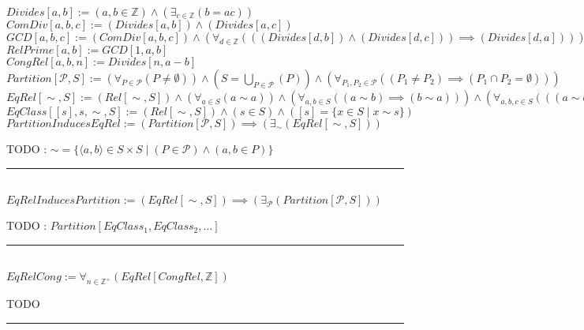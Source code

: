 \documentclass{book}
\newcommand{\abr}{:=}
\newcommand{\st}{\mathbin{|}}
\begin{document}
$Divides[a, b] \abr (a, b \in \mathbb{Z}) \land (\exists_{c \in \mathbb{Z}}(b = a c))$ \\
$ComDiv[a, b, c] \abr (Divides[a, b]) \land (Divides[a, c])$ \\
$GCD[a, b, c] \abr (ComDiv[a, b, c]) \land (\forall_{d \in \mathbb{Z}}(((Divides[d, b]) \land (Divides[d, c])) \implies (Divides[d, a])))$ \\
$RelPrime[a, b] \abr GCD[1, a, b]$ \\
$CongRel[a, b, n] \abr Divides[n, a - b]$ \\

$Partition[\mathcal{P}, S] \abr (\forall_{P \in \mathcal{P}}(P \neq \emptyset)) \land (S = \bigcup\limits_{P \in \mathcal{P}}(P)) \land (\forall_{P_1, P_2 \in \mathcal{P}}((P_1 \neq P_2) \implies (P_1 \cap P_2 = \emptyset)))$ \\
$EqRel[\sim, S] \abr (Rel[\sim, S]) \land (\forall_{a \in S}(a \sim a)) \land (\forall_{a, b \in S}((a \sim b) \implies (b \sim a))) \land (\forall_{a, b, c \in S}(((a \sim b) \land (b \sim c)) \implies (a \sim c)))$ \\
$EqClass[[s], s, \sim, S] \abr (Rel[\sim, S]) \land (s \in S) \land ([s] = \{x \in S \st x \sim s\})$ \\

$PartitionInducesEqRel \abr (Partition[\mathcal{P}, S]) \implies (\exists_{\sim}(EqRel[\sim, S]))$
\begin{enumerate}
  \lit TODO : $\sim = \{\langle a, b \rangle \in S \times S \st (P \in \mathcal{P}) \land (a, b \in P)\}$
\end{enumerate} \vspace{.75mm} \hrule \vspace{.75mm} \ \\ 

$EqRelInducesPartition \abr (EqRel[\sim, S]) \implies (\exists_{\mathcal{P}}(Partition[\mathcal{P}, S]))$
\begin{enumerate}
  \lit TODO : $Partition[EqClass_1, EqClass_2, \ldots]$
\end{enumerate} \vspace{.75mm} \hrule \vspace{.75mm} \ \\ 

$EqRelCong \abr \forall_{n \in \mathbb{Z}^+}(EqRel[CongRel, \mathbb{Z}])$
\begin{enumerate}
  \lit TODO
\end{enumerate} \vspace{.75mm} \hrule \vspace{.75mm} \ \\ 
\end{document}
